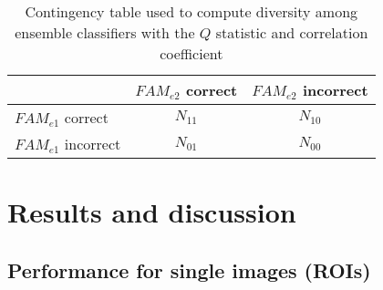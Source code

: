 \begin{table}[t]
  \centering
  \caption{Contingency table used to compute diversity among ensemble classifiers with the $Q$ statistic and correlation coefficient}
  \begin{tabular}{|l|cc|}
  	\hline
  	& $\textit{FAM}_{e2}$ correct & $\textit{FAM}_{e2}$ incorrect \\ \hline
  	$\textit{FAM}_{e1}$ correct   & $N_{11}$ & $N_{10}$ \\ 
  	$\textit{FAM}_{e1}$ incorrect & $N_{01}$ & $N_{00}$ \\ \hline
	\end{tabular}
	\label{tab:c2_Qstat}
\end{table}

\section{Results and discussion}
\label{sec:c2_results_discussion}

\subsection{Performance for single images (ROIs)}

